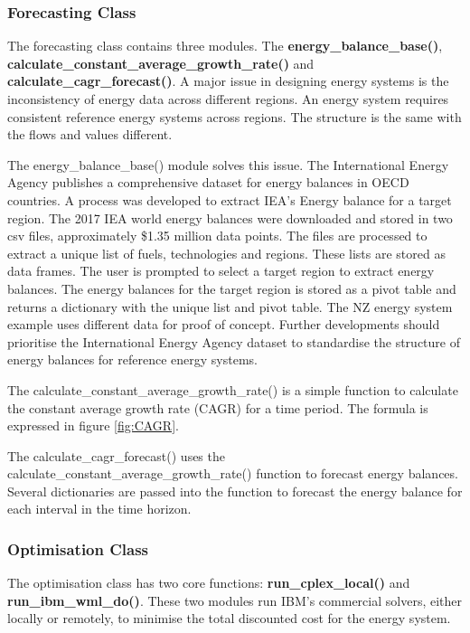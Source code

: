 \documentclass[12pt]{article}
\begin{document}
\subsubsection{Forecasting Class}
The forecasting class contains three modules. The \textbf{energy\_balance\_base()}, \textbf{calculate\_constant\_average\_growth\_rate()} and \textbf{calculate\_cagr\_forecast()}.
A major issue in designing energy systems is the inconsistency of energy data across different regions.
An energy system requires consistent reference energy systems across regions. The structure is the same with the flows and values different.

The energy\_balance\_base() module solves this issue.
The International Energy Agency publishes a comprehensive dataset for energy balances in OECD countries. 
A process was developed to extract IEA's Energy balance for a target region.
The 2017 IEA world energy balances were downloaded and stored in two csv files, approximately \$1.35 million data points.
The files are processed to extract a unique list of fuels, technologies and regions.
These lists are stored as data frames. The user is prompted to select a target region to extract energy balances.
The energy balances for the target region is stored as a pivot table and returns a dictionary with the unique list and pivot table.
The NZ energy system example uses different data for proof of concept. 
Further developments should prioritise the International Energy Agency dataset to standardise the structure of energy balances for reference energy systems.

The calculate\_constant\_average\_growth\_rate() is a simple function to calculate the constant average growth rate (CAGR) for a time period.
The formula is expressed in figure \ref{fig:CAGR}.

The calculate\_cagr\_forecast() uses the calculate\_constant\_average\_growth\_rate() function to forecast energy balances.
Several dictionaries are passed into the function to forecast the energy balance for each interval in the time horizon.

\subsubsection{Optimisation Class}\label{optimisation}
The optimisation class has two core functions: \textbf{run\_cplex\_local()} and \textbf{run\_ibm\_wml\_do()}.
These two modules run IBM's commercial solvers, either locally or remotely, to minimise the total discounted cost for the energy system.
\end{document}
